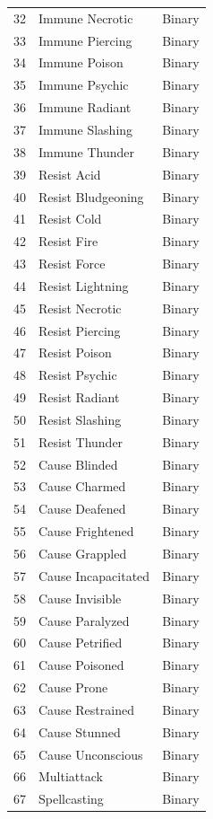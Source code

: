 \documentclass{article}
\begin{document}
\begin{table}[ht]
\begin{tiny}
\begin{minipage}[b]{0.45\linewidth}
\begin{tabular}{@{}rll@{}}
	32 & Immune Necrotic & Binary \\
	33 & Immune Piercing & Binary \\
	34 & Immune Poison & Binary \\
	35 & Immune Psychic & Binary \\
	36 & Immune Radiant & Binary \\
	37 & Immune Slashing & Binary \\
	38 & Immune Thunder & Binary \\
	39 & Resist Acid & Binary \\
	40 & Resist Bludgeoning & Binary \\
	41 & Resist Cold & Binary \\
	42 & Resist Fire & Binary \\
	43 & Resist Force & Binary \\
	44 & Resist Lightning & Binary \\
	45 & Resist Necrotic & Binary \\
	46 & Resist Piercing & Binary \\
	47 & Resist Poison & Binary \\
	48 & Resist Psychic & Binary \\
	49 & Resist Radiant & Binary \\
	50 & Resist Slashing & Binary \\
	51 & Resist Thunder & Binary \\
	52 & Cause Blinded & Binary \\
	53 & Cause Charmed & Binary \\
	54 & Cause Deafened & Binary \\
	55 & Cause Frightened & Binary \\
	56 & Cause Grappled & Binary \\
	57 & Cause Incapacitated & Binary \\
	58 & Cause Invisible & Binary \\
	59 & Cause Paralyzed & Binary \\
	60 & Cause Petrified & Binary \\
	61 & Cause Poisoned & Binary \\
	62 & Cause Prone & Binary \\
	63 & Cause Restrained & Binary \\
	64 & Cause Stunned & Binary \\
	65 & Cause Unconscious & Binary \\
	66 & Multiattack & Binary \\
	67 & Spellcasting & Binary \\

\end{tabular}
\end{minipage}
\end{tiny}
\end{table}
\end{document}
